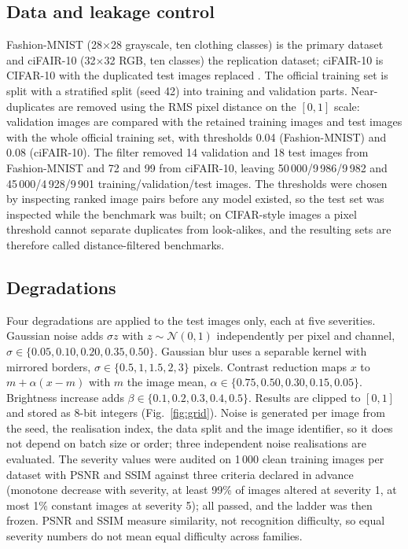 \documentclass[conference]{IEEEtran}
\begin{document}
\subsection{Data and leakage control}
Fashion-MNIST (28$\times$28 grayscale, ten clothing classes) \cite{xiao2017} is the primary dataset and ciFAIR-10 (32$\times$32 RGB, ten classes) the replication dataset;
ciFAIR-10 is CIFAR-10 with the duplicated test images replaced \cite{barz2020}. The official training set is split with a stratified split (seed 42) into training and validation parts.
Near-duplicates are removed using the RMS pixel distance on the $[0,1]$ scale: validation images are compared with the retained training images and test images with the whole
official training set, with thresholds 0.04 (Fashion-MNIST) and 0.08 (ciFAIR-10). The filter removed 14 validation and 18 test images from Fashion-MNIST and 72 and 99 from
ciFAIR-10, leaving 50\,000/9\,986/9\,982 and 45\,000/4\,928/9\,901 training/validation/test images. The thresholds were chosen by inspecting ranked image pairs before any
model existed, so the test set was inspected while the benchmark was built; on CIFAR-style images a pixel threshold cannot separate duplicates from look-alikes, and the
resulting sets are therefore called distance-filtered benchmarks.

\subsection{Degradations}
Four degradations are applied to the test images only, each at five severities. Gaussian noise adds $\sigma z$ with $z\sim\mathcal N(0,1)$ independently per pixel and channel,
$\sigma\in\{0.05,0.10,0.20,0.35,0.50\}$. Gaussian blur uses a separable kernel with mirrored borders, $\sigma\in\{0.5,1,1.5,2,3\}$ pixels. Contrast reduction maps $x$ to $m+\alpha(x-m)$ with $m$ the image mean,
$\alpha\in\{0.75,0.50,0.30,0.15,0.05\}$. Brightness increase adds $\beta\in\{0.1,0.2,0.3,0.4,0.5\}$. Results are clipped to $[0,1]$ and stored as 8-bit integers (Fig.~\ref{fig:grid}).
Noise is generated per image from the seed, the realisation index, the data split and the image identifier, so it does not depend on batch size or order; three independent noise realisations are evaluated.
The severity values were audited on 1\,000 clean training images per dataset with PSNR and SSIM against three criteria declared in advance (monotone decrease with severity,
at least 99\% of images altered at severity 1, at most 1\% constant images at severity 5); all passed, and the ladder was then frozen. PSNR and SSIM measure similarity, not recognition difficulty,
so equal severity numbers do not mean equal difficulty across families.
\end{document}
